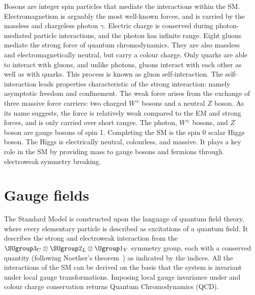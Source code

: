Bosons are integer spin particles that mediate the interactions within the SM. Electromagnetism is arguably the most well-known forces, and is carried by the massless and chargeless photon $\gamma$. Electric charge is conserved during photon-mediated particle interactions, and the photon has infinite range. Eight gluons mediate the strong force of quantum chromodynamics. They are also massless and electromagnetically neutral, but carry a colour charge. Only quarks are able to interact with gluons, and unlike photons, gluons interact with each other as well as with quarks. This process is known as gluon self-interaction. The self-interaction leads properties characteristic of the strong interaction: namely asymptotic freedom and confinement. 
The weak force arises from the exchange of three massive force carriers: two charged $W^{\pm}$ bosons and a neutral $Z$ boson. As its name suggests, the force is relatively weak compared to the EM and strong forces, and is only carried over short ranges. The photon, $W^{\pm}$ bosons, and $Z$ boson are gauge bosons of spin 1. Completing the SM is the spin 0 scalar Higgs boson. The Higgs is electrically neutral, colourless, and massive. It plays a key role in the SM by providing mass to gauge bosons and fermions through electroweak symmetry breaking.

%

\section{Gauge fields}

The Standard Model is constructed upon the language of quantum field theory, where every elementary particle is described as excitations of a quantum field. It describes the strong and electroweak interaction from the $\SUgroup3_C\otimes\SUgroup2_L\otimes\Ugroup1_Y$ symmetry group, each with a conserved quantity (following Noether's theorem~\cite{noether}) as indicated by the indices. All the interactions of the SM can be derived on the basis that the system is invariant under local gauge transformations. Imposing local gauge invariance under  and colour charge conservation returns Quantum Chromodynamics (QCD). 


